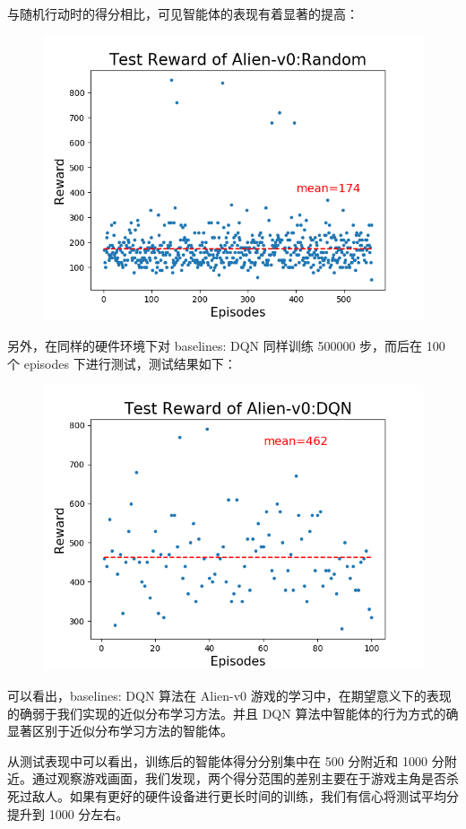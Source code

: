 \documentclass[UTF8]{ctexart}
\begin{document}
与随机行动时的得分相比，可见智能体的表现有着显著的提高：
\begin{figure}[H]
\centering
\includegraphics[scale=.8]{alien_random.png}
\end{figure}
另外，在同样的硬件环境下对 baselines: DQN 同样训练 500000 步，而后在 100 个 episodes 下进行测试，测试结果如下：
\begin{figure}[H]
\centering
\includegraphics[scale=.8]{alien_dqn.png}
\end{figure}
可以看出，baselines: DQN 算法在 Alien-v0 游戏的学习中，在期望意义下的表现的确弱于我们实现的近似分布学习方法。并且 DQN 算法中智能体的行为方式的确显著区别于近似分布学习方法的智能体。
\par
从测试表现中可以看出，训练后的智能体得分分别集中在 500 分附近和 1000 分附近。通过观察游戏画面，我们发现，两个得分范围的差别主要在于游戏主角是否杀死过敌人。如果有更好的硬件设备进行更长时间的训练，我们有信心将测试平均分提升到 1000 分左右。
\end{document}
